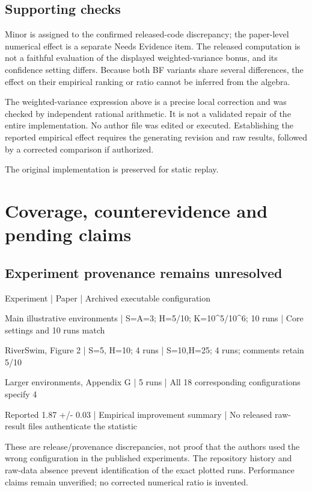 \documentclass[10pt]{article}
\begin{document}
\subsection*{Supporting checks}
Minor is assigned to the confirmed released-code discrepancy; the paper-level numerical effect is a separate Needs Evidence item. The released computation is not a faithful evaluation of the displayed weighted-variance bonus, and its confidence setting differs. Because both BF variants share several differences, the effect on their empirical ranking or ratio cannot be inferred from the algebra.\par
The weighted-variance expression above is a precise local correction and was checked by independent rational arithmetic. It is not a validated repair of the entire implementation. No author file was edited or executed. Establishing the reported empirical effect requires the generating revision and raw results, followed by a corrected comparison if authorized.\par
The original implementation is preserved for static replay.\par
\section*{Coverage, counterevidence and pending claims}
\subsection*{Experiment provenance remains unresolved}
Experiment | Paper | Archived executable configuration\par
Main illustrative environments | S=A=3; H=5/10; K=10\textasciicircum{}5/10\textasciicircum{}6; 10 runs | Core settings and 10 runs match\par
RiverSwim, Figure 2 | S=5, H=10; 4 runs | S=10,H=25; 4 runs; comments retain 5/10\par
Larger environments, Appendix G | 5 runs | All 18 corresponding configurations specify 4\par
Reported 1.87 +/- 0.03 | Empirical improvement summary | No released raw-result files authenticate the statistic\par
These are release/provenance discrepancies, not proof that the authors used the wrong configuration in the published experiments. The repository history and raw-data absence prevent identification of the exact plotted runs. Performance claims remain unverified; no corrected numerical ratio is invented.\par
\end{document}
